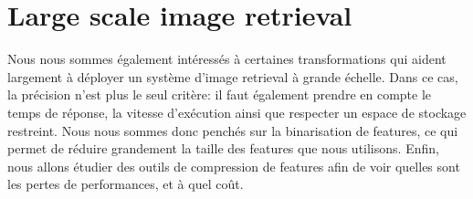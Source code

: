 \section{Large scale image retrieval}

Nous nous sommes également intéressés à certaines transformations qui aident largement à déployer un système d'image
retrieval à grande échelle. Dans ce cas, la précision n'est plus le seul critère: il faut également prendre en compte le
temps de réponse, la vitesse d'exécution ainsi que respecter un espace de stockage restreint. Nous nous sommes donc
penchés sur la binarisation de features, ce qui permet de réduire grandement la taille des features que nous utilisons.
Enfin, nous allons étudier des outils de compression de features afin de voir quelles sont les pertes de performances,
et à quel coût.
